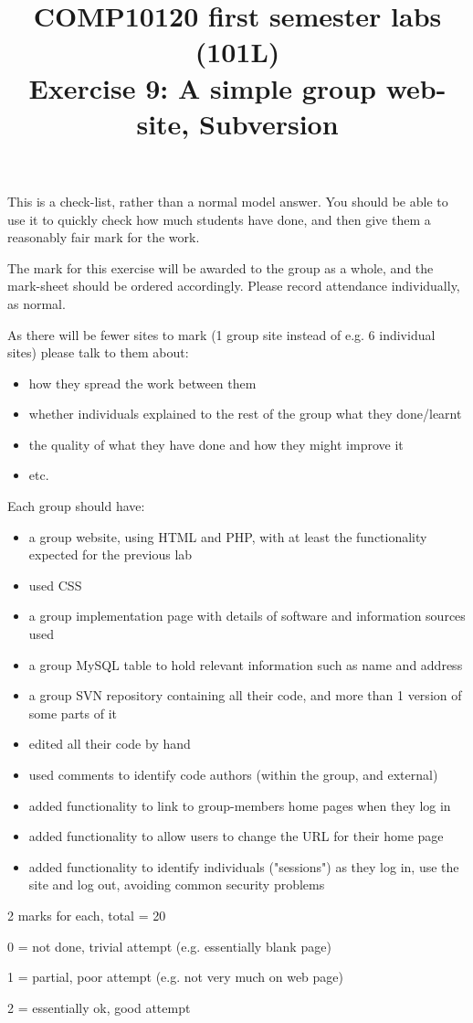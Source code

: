 \documentclass[12pt]{article}
\title{COMP10120 first semester labs (101L) \\
       Exercise 9: A simple group web-site, Subversion}
\author{}
\date{}
\begin{document}
\maketitle

This is a check-list, rather than a normal model answer. You should
be able to use it to quickly check how much students have done, and
then give them a reasonably fair mark for the work.

The mark for this exercise will be awarded to the group as a whole,
and the mark-sheet should be ordered accordingly.
Please record attendance individually, as normal.

As there will be fewer sites to mark (1 group site instead of e.g. 6
individual sites) please talk to them about:

\begin{itemize}
\item how they spread the work between them
\item whether individuals explained to the rest of the group what they
  done/learnt
\item the quality of what they have done and how they might improve it
\item etc.
\end{itemize}

Each group should have:

\begin{itemize}
\item a group website, using HTML and PHP, with at least the functionality
  expected for the previous lab

\item used CSS

\item a group implementation page with details of software and information
  sources used

\item a group MySQL table to hold relevant information such as name and address

\item a group SVN repository containing all their code, and more than 1
  version of some parts of it

\item edited all their code by hand

\item used comments to identify code authors (within the group, and external)

\item added functionality to link to group-members home pages when they
  log in

\item added functionality to allow users to change the URL for their home
  page

\item added functionality to identify individuals ("sessions") as they log
  in, use the site and log out, avoiding common security problems
\end{itemize}


2 marks for each, total = 20

 0 = not done, trivial attempt (e.g. essentially blank page)

 1 = partial, poor attempt (e.g. not very much on web page)

 2 = essentially ok, good attempt
\end{document}
